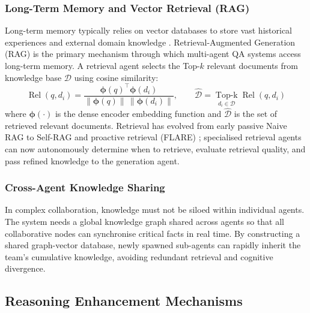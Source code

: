 \subsubsection{Long-Term Memory and Vector Retrieval (RAG)}
\label{sec:long_mem}

Long-term memory typically relies on vector databases to store vast
historical experiences and external domain knowledge
\citep{zhang2024memory_survey}.
Retrieval-Augmented Generation (RAG) \citep{lewis2020rag,gao2024rag_survey}
is the primary mechanism through which multi-agent QA systems access
long-term memory.
A retrieval agent selects the Top-$k$ relevant documents from knowledge
base $\mathcal{D}$ using cosine similarity:
\begin{equation}
  \operatorname{Rel}(q,d_i) =
  \frac{\boldsymbol{\phi}(q)^{\top}\boldsymbol{\phi}(d_i)}
       {\|\boldsymbol{\phi}(q)\|\,\|\boldsymbol{\phi}(d_i)\|},\qquad
  \hat{\mathcal{D}} =
  \operatorname*{Top\text{-}k}_{d_i\in\mathcal{D}}\operatorname{Rel}(q,d_i)
  \label{eq:rag}
\end{equation}
where $\boldsymbol{\phi}(\cdot)$ is the dense encoder embedding function and
$\hat{\mathcal{D}}$ is the set of retrieved relevant documents.
Retrieval has evolved from early passive Naive RAG to Self-RAG
\citep{asai2024selfrag} and proactive retrieval (FLARE)
\citep{jiang2023active_rag}; specialised retrieval agents can now
autonomously determine when to retrieve, evaluate retrieval quality, and
pass refined knowledge to the generation agent.

\subsubsection{Cross-Agent Knowledge Sharing}
\label{sec:knowledge_share}

In complex collaboration, knowledge must not be siloed within individual
agents.
The system needs a global knowledge graph shared across agents so that all
collaborative nodes can synchronise critical facts in real time.
By constructing a shared graph-vector database, newly spawned sub-agents
can rapidly inherit the team's cumulative knowledge, avoiding redundant
retrieval and cognitive divergence.

\subsection{Reasoning Enhancement Mechanisms}
\label{sec:reasoning}

